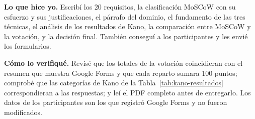 \documentclass[11pt,a4paper]{article}
\begin{document}
\textbf{Lo que hice yo.} Escribí los 20 requisitos, la clasificación MoSCoW con su esfuerzo y sus justificaciones, el párrafo del dominio, el fundamento de las tres técnicas, el análisis de los resultados de Kano, la comparación entre MoSCoW y la votación, y la decisión final. También conseguí a los participantes y les envié los formularios.

\textbf{Cómo lo verifiqué.} Revisé que los totales de la votación coincidieran con el resumen que muestra Google Forms y que cada reparto sumara 100 puntos; comprobé que las categorías de Kano de la Tabla~\ref{tab:kano-resultados} correspondieran a las respuestas; y leí el PDF completo antes de entregarlo. Los datos de los participantes son los que registró Google Forms y no fueron modificados.



\end{document}
